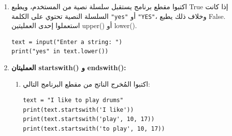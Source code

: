 \documentclass[14pt]{extarticle}
\begin{document}
\begin{enumerate}[resume, label=\textbf{تمرين \arabic*:}, wide=0pt, itemsep=2.2em]
\begin{enumerate}[label=\alph*.]
\item ماذا تنفّذ كل واحدة من العمليتين التاليتين؟
\begin{itemize}
\item العملية \textenglish{upper()}:
\item العملية \textenglish{lower()}:
\end{itemize}
\ifwithsols
\begin{boxSolution}
\begin{itemize}
\item \textenglish{upper()}: تعيد سلسلة نصية جديدة تمّ فيها تحويل جميع الأحرف الإنجليزية إلى أحرف كبيرة (\textenglish{Capital letters}) دون تغيير السلسلة النصية الأصلية.
\item \textenglish{lower()}: تعيد سلسلة نصية جديدة تمّ فيها تحويل جميع الأحرف الإنجليزية إلى أحرف صغيرة (\textenglish{Small letters}) دون تغيير السلسلة النصية الأصلية.
\end{itemize}
\end{boxSolution}
\fi
\filbreak
\end{enumerate}
\filbreak

\item اكتبوا مقطع برنامج يستقبل سلسلة نصية من المستخدم، ويطبع \textenglish{True} إذا كانت السلسلة النصية تحتوي على الكلمة \textenglish{\texttt{"yes"}} أو \textenglish{\texttt{"YES"}}، وخلاف ذلك يطبع \textenglish{False}. استعملوا إحدى العمليتين \textenglish{upper()} أو \textenglish{lower()}.

\ifwithsols
\begin{boxSolution}
\begin{english}
\begin{verbatim}
text = input("Enter a string: ")
print("yes" in text.lower())
\end{verbatim}
\end{english}
\end{boxSolution}
\fi
\filbreak

\item \textbf{العمليتان \textenglish{startswith()} و \textenglish{endswith()}:}
\begin{enumerate}[label=\alph*.]
\item اكتبوا المُخرج الناتج من مقطع البرنامج التالي:

\begin{boxCode}
\begin{english}
\begin{verbatim}
text = "I like to play drums"
print(text.startswith('I like'))
print(text.startswith('play', 10, 17))
print(text.startswith('to play', 10, 17))
\end{verbatim}
\end{english}
\end{boxCode}


\end{enumerate}
\end{enumerate}
\end{document}
